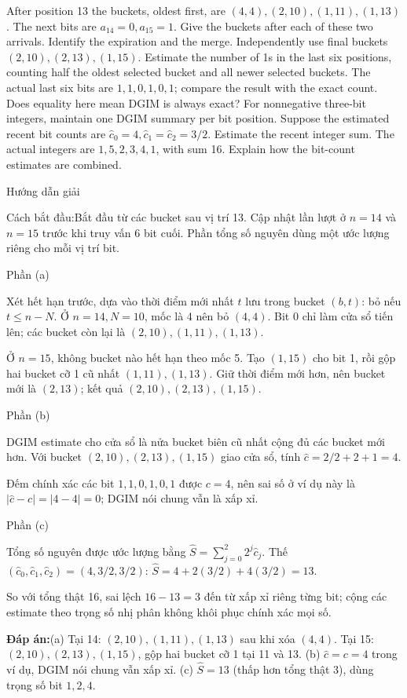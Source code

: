 \documentclass[10pt,a4paper,twocolumn]{article}
\makeatletter
\newcommand{\maptag}[1]{\phantomsection\@bsphack\protected@write\@auxout{}{\string\newlabel{#1}{{}{\thepage}{}{\@currentHref}{}}}\@esphack}
\newcommand{\key}[1]{#1:\enspace}
\newcommand{\solutionprompt}[1]{\par\addvspace{1pt}\noindent\key{Cách bắt đầu}#1\par\addvspace{2pt}}
\newcommand{\blocklabel}[1]{\par\noindent#1\par\nobreak}
\newcommand{\answer}[1]{%
  \par\addvspace{3pt}%
  \blocklabel{#1Hướng dẫn giải}}
\newcommand{\finalanswer}[1]{%
  \par\addvspace{3pt}\noindent\textbf{Đáp án:}\nobreak\enspace#1\par}
\newcommand{\guidepart}[1]{%
  \par\addvspace{1.5pt}%
  \blocklabel{Phần #1}}
\makeatother
\begin{document}
After position 13 the buckets, oldest first, are $(4,4),(2,10),(1,11),(1,13)$. The next bits are $a_{14}=0,a_{15}=1$.
 Give the buckets after each of these two arrivals. Identify the expiration and the merge.
 Independently use final buckets $(2,10),(2,13),(1,15)$. Estimate the number of 1s in the last six positions, counting half the oldest selected bucket and all newer selected buckets. The actual last six bits are $1,1,0,1,0,1$; compare the result with the exact count. Does equality here mean DGIM is always exact?
 For nonnegative three-bit integers, maintain one DGIM summary per bit position. Suppose the estimated recent bit counts are $\hat c_0=4,\hat c_1=\hat c_2=3/2$. Estimate the recent integer sum. The actual integers are $1,5,2,3,4,1$, with sum 16. Explain how the bit-count estimates are combined.

\answer{\maptag{answer:Pr22}}
\solutionprompt{Bắt đầu từ các bucket sau vị trí 13. Cập nhật lần lượt ở $n=14$ và $n=15$ trước khi truy vấn 6 bit cuối. Phần tổng số nguyên dùng một ước lượng riêng cho mỗi vị trí bit.}
\guidepart{(a)}
\begin{guidesteps}
\item Xét hết hạn trước, dựa vào thời điểm mới nhất $t$ lưu trong bucket $(b,t)$: bỏ nếu $t\le n-N$. Ở $n=14,N=10$, mốc là 4 nên bỏ $(4,4)$. Bit 0 chỉ làm cửa sổ tiến lên; các bucket còn lại là $(2,10),(1,11),(1,13)$.
\item Ở $n=15$, không bucket nào hết hạn theo mốc 5. Tạo $(1,15)$ cho bit 1, rồi gộp hai bucket cỡ 1 cũ nhất $(1,11),(1,13)$. Giữ thời điểm mới hơn, nên bucket mới là $(2,13)$; kết quả $(2,10),(2,13),(1,15)$.
\end{guidesteps}
\guidepart{(b)}
\begin{guidesteps}
\item DGIM estimate cho cửa sổ là nửa bucket biên cũ nhất cộng đủ các bucket mới hơn. Với bucket $(2,10),(2,13),(1,15)$ giao cửa sổ, tính $\hat c=2/2+2+1=4$.
\item Đếm chính xác các bit $1,1,0,1,0,1$ được $c=4$, nên sai số ở ví dụ này là $|\hat c-c|=|4-4|=0$; DGIM nói chung vẫn là xấp xỉ.
\end{guidesteps}
\guidepart{(c)}
\begin{guidesteps}
\item Tổng số nguyên được ước lượng bằng $\hat S=\sum_{j=0}^{2}2^j\hat c_j$. Thế $(\hat c_0,\hat c_1,\hat c_2)=(4,3/2,3/2)$: $\hat S=4+2(3/2)+4(3/2)=13$.
\item So với tổng thật 16, sai lệch $16-13=3$ đến từ xấp xỉ riêng từng bit; cộng các estimate theo trọng số nhị phân không khôi phục chính xác mọi số.
\end{guidesteps}
\finalanswer{(a) Tại 14: $(2,10),(1,11),(1,13)$ sau khi xóa $(4,4)$. Tại 15: $(2,10),(2,13),(1,15)$, gộp hai bucket cỡ 1 tại 11 và 13. (b) $\hat c=c=4$ trong ví dụ, DGIM nói chung vẫn xấp xỉ. (c) $\widehat S=13$ (thấp hơn tổng thật 3), dùng trọng số bit $1,2,4$.}
\end{document}
